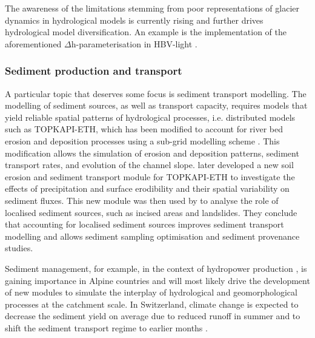 \documentclass[10pt,a4paper]{article}
\begin{document}
The awareness of the limitations stemming from poor representations of glacier dynamics in hydrological models is currently rising and further drives hydrological model diversification. 
An example is the implementation of the aforementioned $\Delta$h-parameterisation in HBV-light \citep{Seibert2018}. 






\subsubsection{Sediment production and transport}
\label{sec:context:sediments}

A particular topic that deserves some focus is sediment transport modelling. The modelling of sediment sources, as well as transport capacity, requires models that yield reliable spatial patterns of hydrological processes, i.e. distributed models such as TOPKAPI-ETH, which has been modified to account for river bed erosion and deposition processes using a sub-grid modelling scheme \citep{Konz2011}. This modification allows the simulation of erosion and deposition patterns, sediment transport rates, and evolution of the channel slope. \citet{Battista2020a} later developed a new soil erosion and sediment transport module for TOPKAPI-ETH to investigate the effects of precipitation and surface erodibility and their spatial variability on sediment fluxes. This new module was then used by \citet{Battista2020} to analyse the role of localised sediment sources, such as incised areas and landslides. They conclude that accounting for localised sediment sources improves sediment transport modelling and allows sediment sampling optimisation and sediment provenance studies.

Sediment management, for example, in the context of hydropower production \citep{RaymondPralong2015, Gabbud2016}, is gaining importance in Alpine countries and will most likely drive the development of new modules to simulate the interplay of hydrological and geomorphological processes at the catchment scale. In Switzerland, climate change is expected to decrease the sediment yield on average due to reduced runoff in summer and to shift the sediment transport regime to earlier months \citep[as found by ][using PREVAH]{RaymondPralong2015}.
\end{document}
